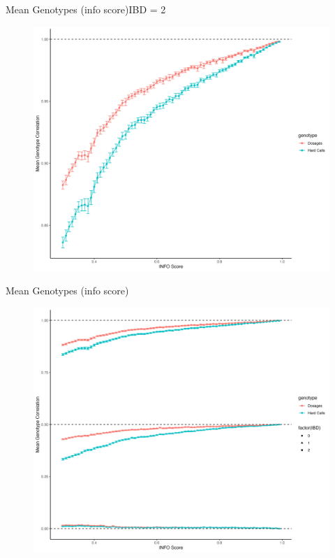 \documentclass{beamer}
\begin{document}
\begin{frame}{Mean Genotypes (info score)}{IBD = 2}

      \begin{figure}

            \includegraphics[width= .85\textwidth]{fig/mean_gt_by_ibd_2.png}
            
      \end{figure}

\end{frame}




\begin{frame}{Mean Genotypes (info score)}

      \begin{figure}

            \includegraphics[width= .85\textwidth]{fig/mean_gt_by_ibd.png}
            
      \end{figure}

\end{frame}
\end{document}
